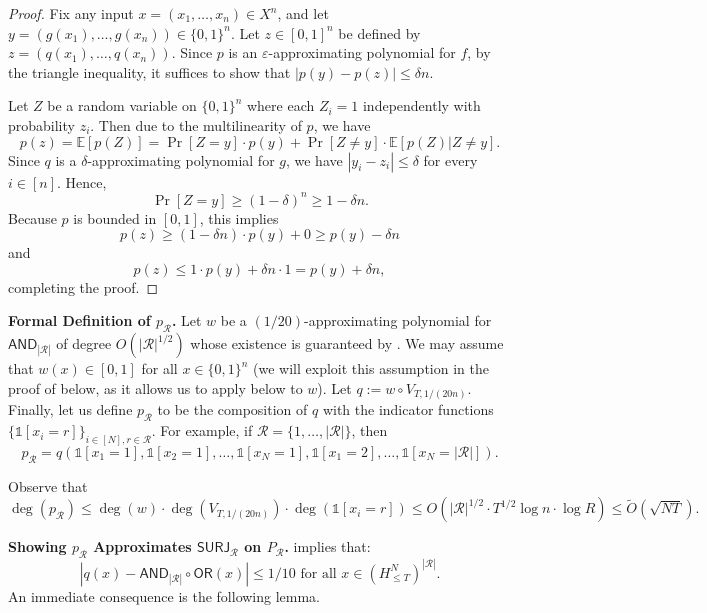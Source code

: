 \documentclass[11pt, letterpaper, fleqn]{article}
\theoremstyle{plain}
\newcommand{\E}{\mathbb{E}}
\newcommand{\SURJ}{\mathsf{ SURJ}}
\newcommand{\OR}{\mathsf{ OR}}
\newcommand{\B}{\{0,1\}}
\newcommand{\eps}{\varepsilon}
\newcommand{\id}{{\mathds{1}}}
\newcommand{\AND}{\mathsf{AND}}
\begin{document}
\begin{proof}
Fix any input $x = (x_1, \dots, x_n) \in X^n$, and let $y = (g(x_1), \dots, g(x_n)) \in \B^n$. Let $z \in [0, 1]^n$ be defined by $z = (q(x_1), \dots, q(x_n))$. Since $p$ is an $\eps$-approximating polynomial for $f$, by the triangle inequality, it suffices to show that $|p(y) - p(z)| \le \delta n$.

Let $Z$ be a random variable on $\B^n$ where each $Z_i = 1$ independently with probability $z_i$. Then due to the multilinearity of $p$, we have
\[p(z) = \E[p(Z)] = \Pr[Z =y] \cdot p(y) + \Pr[Z \ne y] \cdot \E[p(Z) | Z \ne y].\]
Since $q$ is a $\delta$-approximating polynomial for $g$, we have $|y_i - z_i| \le \delta$ for every $i \in [n]$.  Hence,
\[\Pr[Z = y] \ge \left(1 - \delta \right)^n \ge 1 - \delta n.\]
Because $p$ is bounded in $[0, 1]$, this implies
\[p(z) \ge (1 - \delta n) \cdot p(y) + 0 \ge p(y) - \delta n\]
and
\[p(z) \le 1 \cdot p(y) + \delta n \cdot 1 = p(y) + \delta n,\]
completing the proof.
\end{proof}


\medskip \noindent \textbf{Formal Definition of $p_{\mathcal{R}}$.} Let $w$ be a $(1/20)$-approximating polynomial for $\AND_{|\mathcal{R}|}$ of degree $O(|\mathcal{R}|^{1/2})$
whose existence is guaranteed by . We may assume that $w(x) \in [0, 1]$ for all $x \in \B^n$ (we will exploit this assumption in the proof of  below, as it allows
us to apply  below to $w$). Let $q := w \circ V_{T, 1/(20n)}$.
Finally, let us define $p_{\mathcal{R}}$ to be the composition of $q$ with the indicator functions $\{\id[x_i=r]\}_{i \in [N], r \in \mathcal{R}}$.
For example, if $\mathcal{R}=\{1, \dots, |\mathcal{R}|\}$,
then \begin{equation*} p_{\mathcal{R}} = q\left(\id\left[x_1 = 1\right], \id\left[x_2=1\right], \dots,
\id\left[x_N=1\right], \id\left[x_1=2\right], \dots, \id\left[x_N=\left|\mathcal{R}\right|\right]\right).
\end{equation*}


Observe that $$\deg(p_{\mathcal{R}}) \leq \deg(w) \cdot \deg(V_{T, 1/(20n)}) \cdot \deg(\id[x_i=r]) \leq O\left(|\mathcal{R}|^{1/2} \cdot T^{1/2} \log n \cdot \log R\right) \leq \tilde{O}\left(\sqrt{NT}\right).$$


\medskip \noindent \textbf{Showing $p_{\mathcal{R}}$ Approximates $\SURJ_{\mathcal{R}}$ on $P_{\mathcal{R}}$.}
 implies that:
\begin{equation} |q(x) - \AND_{|\mathcal{R}|} \circ \OR(x)| \leq 1/10 \text{ for all } x \in \left(H^N_{\le T}\right)^{|\mathcal{R}|}. \label{imdoneguys} \end{equation} 
An immediate consequence is the following lemma.
\end{document}

